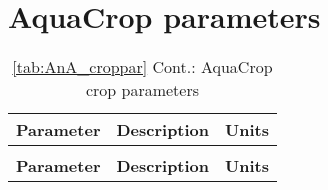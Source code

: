 \chapter{AquaCrop parameters}\label{ch:appendixA}


\begin{footnotesize}
\begin{longtable}{p{}p{}p{}}
\caption{AquaCrop crop parameters}\\
\toprule
\textbf{Parameter} & \textbf{Description} & \textbf{Units} \\
\midrule
\endfirsthead

\caption*{\autoref{tab:AnA_croppar} Cont.: AquaCrop crop parameters}\\
\toprule
\textbf{Parameter} & \textbf{Description} & \textbf{Units} \\
\midrule
\endhead


\end{longtable}
\end{footnotesize}
